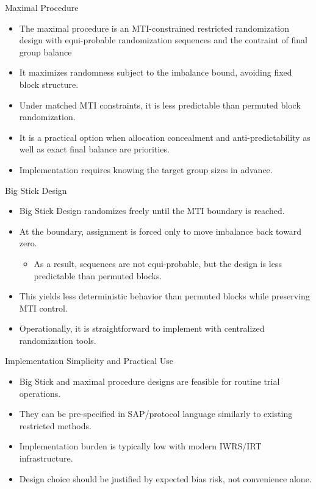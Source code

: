 \documentclass[
  11pt,
  ignorenonframetext,
  aspectratio=169,
]{beamer}
\providecommand{\tightlist}{%
  \setlength{\itemsep}{0pt}\setlength{\parskip}{0pt}}
\begin{document}
\begin{frame}{Maximal Procedure}
\protect\hypertarget{maximal-procedure}{}
\begin{itemize}
\tightlist
\item
  The maximal procedure is an MTI-constrained restricted randomization
  design with equi-probable randomization sequences and the contraint of
  final group balance
\item
  It maximizes randomness subject to the imbalance bound, avoiding fixed
  block structure.
\item
  Under matched MTI constraints, it is less predictable than permuted
  block randomization.
\item
  It is a practical option when allocation concealment and
  anti-predictability as well as exact final balance are priorities.
\item
  Implementation requires knowing the target group sizes in advance.
\end{itemize}
\end{frame}

\begin{frame}{Big Stick Design}
\protect\hypertarget{big-stick-design}{}
\begin{itemize}
\tightlist
\item
  Big Stick Design randomizes freely until the MTI boundary is reached.
\item
  At the boundary, assignment is forced only to move imbalance back
  toward zero.

  \begin{itemize}
  \tightlist
  \item
    As a result, sequences are not equi-probable, but the design is less
    predictable than permuted blocks.
  \end{itemize}
\item
  This yields less deterministic behavior than permuted blocks while
  preserving MTI control.
\item
  Operationally, it is straightforward to implement with centralized
  randomization tools.
\end{itemize}
\end{frame}

\begin{frame}{Implementation Simplicity and Practical Use}
\protect\hypertarget{implementation-simplicity-and-practical-use}{}
\begin{itemize}
\tightlist
\item
  Big Stick and maximal procedure designs are feasible for routine trial
  operations.
\item
  They can be pre-specified in SAP/protocol language similarly to
  existing restricted methods.
\item
  Implementation burden is typically low with modern IWRS/IRT
  infrastructure.
\item
  Design choice should be justified by expected bias risk, not
  convenience alone.
\end{itemize}
\end{frame}
\end{document}
